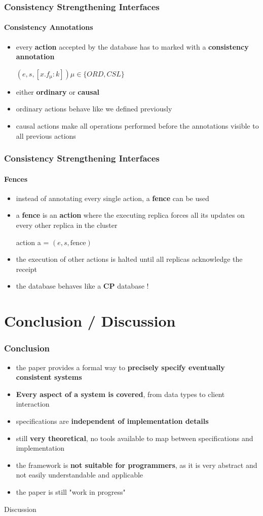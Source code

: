 \documentclass[11pt]{beamer}
\begin{document}
\begin{frame}
\frametitle{Consistency Strengthening Interfaces}
\framesubtitle{Consistency Annotations}
\begin{itemize}
\item every \textbf{action} accepted by the database has to marked with a \textbf{consistency annotation}
\begin{center} \((e,s,[x.f\mathrm{_{\mu}}:k]) \mu \in \{ORD, CSL\}\)\end{center} 
\item either \textbf{ordinary} or \textbf{causal}
\item ordinary actions behave like we defined previously
\item causal actions make all operations performed before the annotations visible to all previous actions
\end{itemize}
\end{frame}

\begin{frame}
\frametitle{Consistency Strengthening Interfaces}
\framesubtitle{Fences}
\begin{itemize}
\item instead of annotating every single action, a \textbf{fence} can be used
\item a \textbf{fence} is an \textbf{action} where the executing replica forces all its updates on every other replica in the cluster
\begin{center} action a =  \((e,s, \mathrm{fence})\)\end{center} 
\item the execution of other actions is halted until all replicas acknowledge the receipt
\pause
\item the database behaves like a \textbf{CP} database !
\end{itemize}
\end{frame}


\section{Conclusion / Discussion}

\begin{frame}
\frametitle{Conclusion}
\begin{itemize}
\item<pro@1-> the paper provides a formal way to \textbf{precisely specify eventually consistent systems}
\item<pro@1-> \textbf{Every aspect of a system is covered}, from data types to client interaction
\item<pro@1-> specifications are \textbf{independent of implementation details}
\item<con@1-> still \textbf{very theoretical}, no tools available to map between specifications and implementation 
\item<con@1-> the framework is \textbf{not suitable for programmers}, as it is very abstract and not easily understandable and applicable
\item<con@1-> the paper is still "work in progress"
\end{itemize}
\end{frame}

\begin{frame}
\begin{center}
\begin{Huge}
Discussion
\end{Huge}
\end{center}
\end{frame}
\end{document}
